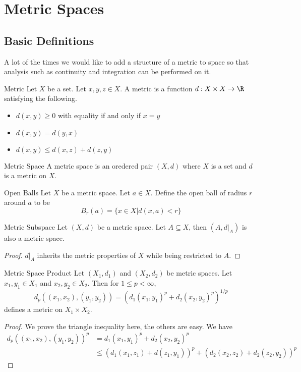 \section{Metric Spaces}
\subsection{Basic Definitions}
A lot of the times we would like to add a structure of a metric to space so that analysis such as continuity and integration can be performed on it. 

\begin{defn}{Metric}{} Let $X$ be a set. Let $x,y,z\in X$. A metric is a function $d:X\times X\to\R$ satisfying the following. 
\begin{itemize}
\item $d(x,y)\geq 0$ with equality if and only if $x=y$
\item $d(x,y)=d(y,x)$
\item $d(x,y)\leq d(x,z)+d(z,y)$
\end{itemize}
\end{defn}

\begin{defn}{Metric Space}{} A metric space is an oredered pair $(X,d)$ where $X$ is a set and $d$ is a metric on $X$. 
\end{defn}

\begin{defn}{Open Balls}{} Let $X$ be a metric space. Let $a\in X$. Define the open ball of radius $r$ around $a$ to be $$B_r(a)=\{x\in X|d(x,a)<r\}$$
\end{defn}

\begin{lmm}{Metric Subspace}{} Let $(X,d)$ be a metric space. Let $A\subseteq X$, then $(A,d|_A)$ is also a metric space. \tcbline
\begin{proof}
$d|_A$ inherits the metric properties of $X$ while being restricted to $A$. 
\end{proof}
\end{lmm}

\begin{prp}{Metric Space Product}{} Let $(X_1,d_1)$ and $(X_2,d_2)$ be metric spaces. Let $x_1,y_1\in X_1$ and $x_2,y_2\in X_2$. Then for $1\leq p<\infty$, $$d_p((x_1,x_2),(y_1,y_2))=(d_1(x_1,y_1)^p+d_2(x_2,y_2)^p)^{1/p}$$ defines a metric on $X_1\times X_2$. \tcbline
\begin{proof}
We prove the triangle inequality here, the others are easy. We have
\begin{align*}
d_p((x_1,x_2),(y_1,y_2))^p&=d_1(x_1,y_1)^p+d_2(x_2,y_2)^p\\
&\leq(d_1(x_1,z_1)+d(z_1,y_1))^p+(d_2(x_2,z_2)+d_2(z_2,y_2))^p
\end{align*}
\end{proof}
\end{prp}

